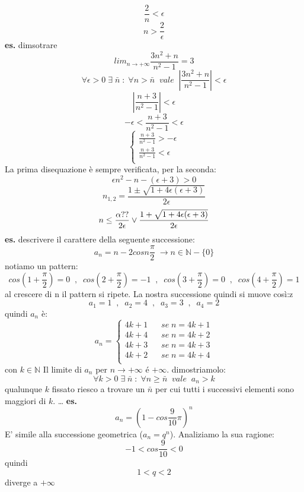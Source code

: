 \[
    \frac{2}{n}< \epsilon
\]
\[
    n> \frac{2}{\epsilon}
\]
\newline
\newline
\textbf{es.} dimsotrare
\[
    lim_{n\rightarrow+\infty} \frac{3n^2 +n}{n^2-1} = 3
\]
\[
    \forall \epsilon > 0 \;\exists\; \bar{n} \;:\; \forall n > \bar{n} \;\;vale\;\; |\frac{3n^2 +n}{n^2-1}| <\epsilon 
\]
\[
    |\frac{n+3}{n^2-1}|<\epsilon
\]
\[
    -\epsilon< \frac{n+3}{n^2-1}< \epsilon
\]
\[
    \begin{cases}
        \frac{n+3}{n^2-1}>-\epsilon \\
        \frac{n+3}{n^2-1}< \epsilon \\
    \end{cases}
\]
La prima disequazione è sempre verificata, per la seconda:
\[
    \epsilon n^2 - n -(\epsilon + 3) > 0
\]
\[
    n_{1,2} = \frac{1 \pm \sqrt{1+4\epsilon(\epsilon+3)}}{2\epsilon}
\]
\[
    n \leq \frac{\-\alpha ??}{2\epsilon} \lor \frac{1+\sqrt{1+4\epsilon(\epsilon+3)}}{2\epsilon}
\]
\newline
\newline
\textbf{es.} descrivere il carattere della seguente successione:
\[
    a_n = n-2 cos n \frac{\pi}{2} \;\rightarrow n\in \mathbb{N}- \{0\}
\]
notiamo un pattern:
\[
    cos(1+ \frac{\pi}{2}) = 0 \;\;,\;\;
    cos(2+ \frac{\pi}{2}) = -1 \;\;,\;\;
    cos(3+ \frac{\pi}{2}) = 0 \;\;,\;\;
    cos(4+ \frac{\pi}{2}) = 1
\]
al crescere di n il pattern si ripete. La nostra successione quindi si muove così:z
\[
    a_1 = 1 \;\;,\;\;
    a_2 = 4 \;\;,\;\;
    a_3 = 3 \;\;,\;\;
    a_4 = 2
\]
quindi $a_n$ è:
\[
    a_n = 
    \begin{cases}
        4k+1 \;\;\;&se \;n= 4k+1 \\
        4k+4 \;\;\;&se \;n = 4k+2\\
        4k+3 \;\;\;&se \;n= 4k+3\\
        4k+2 \;\;\;&se \;n= 4k+4\\
    \end{cases}
\]
con $k \in \mathbb{N}$
\newline
Il limite di $a_n$ per $n\rightarrow +\infty$ é $+\infty$.
\newline
dimostriamolo:
\[
    \forall k>0 \;\exists\; \bar{n} \;:\; \forall n \geq \bar{n} \;\;vale\;\; a_n> k
\]
qualunque $k$ fissato riesco a trovare un $\bar{n}$ per cui tutti i successivi elementi sono maggiori di $k$.
 \dots
\newline
\newline
\newline
\textbf{es.} 
\[
    a_n = (1-cos \frac{9}{10}\pi )^n
\]
E' simile alla successione geometrica ($a_n = q^n$).
\newline
Analiziamo la sua ragione:
\[
    -1 < cos \frac{9}{10} < 0
\]
quindi
\[
    1<q<2  
\]
diverge a $+\infty$
\newpage